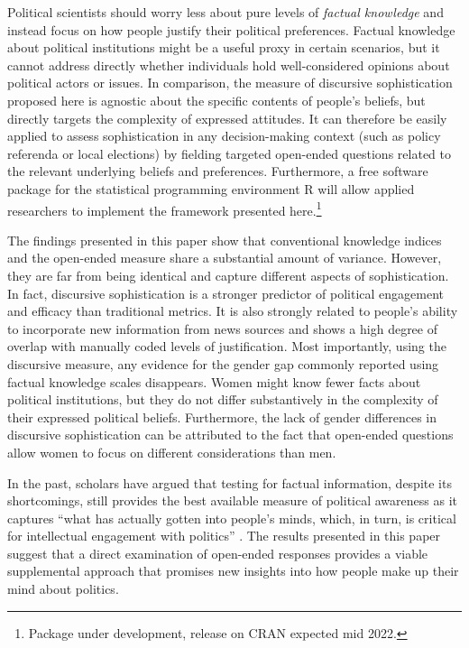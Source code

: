 Political scientists should worry less about pure levels of \textit{factual knowledge} and instead focus on how people justify their political preferences. Factual knowledge about political institutions might be a useful proxy in certain scenarios, but it cannot address directly whether individuals hold well-considered opinions about political actors or issues. In comparison, the measure of discursive sophistication proposed here is agnostic about the specific contents of people's beliefs, but directly targets the complexity of expressed attitudes. It can therefore be easily applied to assess sophistication in any decision-making context (such as policy referenda or local elections) by fielding targeted open-ended questions related to the relevant underlying beliefs and preferences. Furthermore, a free software package for the statistical programming environment R will allow applied researchers to implement the framework presented here.\footnote{Package under development, release on CRAN expected mid 2022.}

The findings presented in this paper show that conventional knowledge indices and the open-ended measure share a substantial amount of variance. However, they are far from being identical and capture different aspects of sophistication. In fact, discursive sophistication is a stronger predictor of political engagement and efficacy than traditional metrics. It is also strongly related to people's ability to incorporate new information from news sources and shows a high degree of overlap with manually coded levels of justification. Most importantly, using the discursive measure, any evidence for the gender gap commonly reported using factual knowledge scales disappears. Women might know fewer facts about political institutions, but they do not differ substantively in the complexity of their expressed political beliefs. Furthermore, the lack of gender differences in discursive sophistication can be attributed to the fact that open-ended questions allow women to focus on different considerations than men.

In the past, scholars have argued that testing for factual information, despite its shortcomings, still provides the best available measure of political awareness as it captures ``what has actually gotten into people's minds, which, in turn, is critical for intellectual engagement with politics'' \citet[21]{zaller1992nature}. The results presented in this paper suggest that a direct examination of open-ended responses provides a viable supplemental approach that promises new insights into how people make up their mind about politics.


